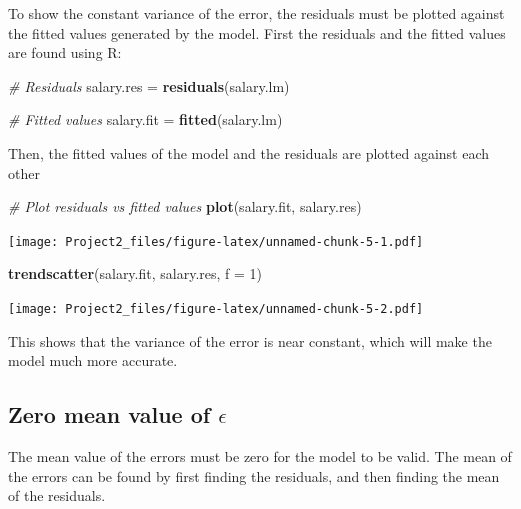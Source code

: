 \documentclass[]{article}
\newenvironment{Shaded}{\begin{snugshade}}{\end{snugshade}}
\newcommand{\CommentTok}[1]{\textcolor[rgb]{0.56,0.35,0.01}{\textit{#1}}}
\newcommand{\DataTypeTok}[1]{\textcolor[rgb]{0.13,0.29,0.53}{#1}}
\newcommand{\DecValTok}[1]{\textcolor[rgb]{0.00,0.00,0.81}{#1}}
\newcommand{\KeywordTok}[1]{\textcolor[rgb]{0.13,0.29,0.53}{\textbf{#1}}}
\newcommand{\NormalTok}[1]{#1}
\newcommand{\StringTok}[1]{\textcolor[rgb]{0.31,0.60,0.02}{#1}}
\begin{document}
To show the constant variance of the error, the residuals must be
plotted against the fitted values generated by the model. First the
residuals and the fitted values are found using R:

\begin{Shaded}
\begin{Highlighting}[]
\CommentTok{# Residuals}
\NormalTok{salary.res =}\StringTok{ }\KeywordTok{residuals}\NormalTok{(salary.lm)}

\CommentTok{# Fitted values}
\NormalTok{salary.fit =}\StringTok{ }\KeywordTok{fitted}\NormalTok{(salary.lm)}
\end{Highlighting}
\end{Shaded}

Then, the fitted values of the model and the residuals are plotted
against each other

\begin{Shaded}
\begin{Highlighting}[]
\CommentTok{# Plot residuals vs fitted values}
\KeywordTok{plot}\NormalTok{(salary.fit, salary.res)}
\end{Highlighting}
\end{Shaded}

\texttt{[image: Project2\_files/figure-latex/unnamed-chunk-5-1.pdf]}

\begin{Shaded}
\begin{Highlighting}[]
\KeywordTok{trendscatter}\NormalTok{(salary.fit, salary.res, }\DataTypeTok{f =} \DecValTok{1}\NormalTok{)}
\end{Highlighting}
\end{Shaded}

\texttt{[image: Project2\_files/figure-latex/unnamed-chunk-5-2.pdf]}

This shows that the variance of the error is near constant, which will
make the model much more accurate.

\hypertarget{zero-mean-value-of-epsilon}{%
\subsection{\texorpdfstring{Zero mean value of
\(\epsilon\)}{Zero mean value of \textbackslash epsilon}}\label{zero-mean-value-of-epsilon}}

The mean value of the errors must be zero for the model to be valid. The
mean of the errors can be found by first finding the residuals, and then
finding the mean of the residuals.
\end{document}
